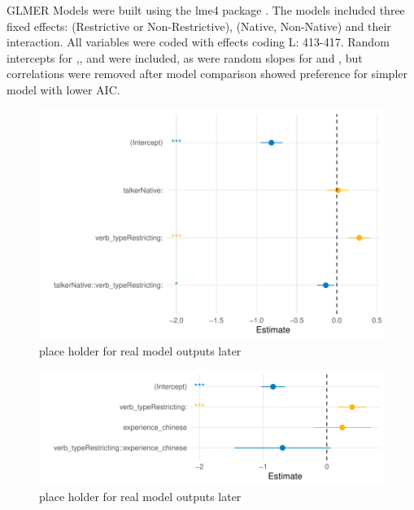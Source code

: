


GLMER Models were built using the lme4 package \parencite{Bates2014-eq}. The models included three fixed effects:  (Restrictive or Non-Restrictive), (Native, Non-Native) and their interaction. All variables were coded with
effects coding L: 413-417. Random intercepts for ,, and
 were included, as were random slopes for  and , but correlations were removed after model comparison showed preference for simpler model with lower AIC.






\begin{figure}[h]
    \centering
    \includegraphics[width=\textwidth]{figures/GLMER_base_model.pdf}
    \caption{place holder for real model outputs later}
    \label{fig:model_outputs}
\end{figure}

\begin{figure}[h]
    \centering
    \includegraphics[width=\textwidth]{figures/GLMER_accent_model.pdf}
    \caption{place holder for real model outputs later}
    \label{fig:model_outputs}
\end{figure}

